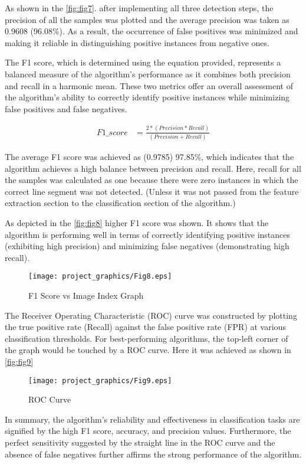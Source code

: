 \documentclass[]{iat}
\begin{document}
\par
As shown in the \autoref{fig:fig7}. after implementing all three detection steps, the precision of all the samples was plotted and the average precision was taken as 0.9608 (96.08\%). As a result, the occurrence of false positives was minimized and making it reliable in distinguishing positive instances from negative ones.
\par
The F1 score, which is determined using the equation provided, represents a balanced measure of the algorithm's performance as it combines both precision and recall in a harmonic mean. These two metrics offer an overall assessment of the algorithm's ability to correctly identify positive instances while minimizing false positives and false negatives.
\par
\FloatBarrier
\begin{align}
F1\_score &=\frac{2*(Precision*Recall)}{(Precision+Recall)}
\end{align}

The average F1 score was achieved as (0.9785) 97.85\%, which indicates that the algorithm achieves a high balance between precision and recall. Here, recall for all the samples was calculated as one because there were zero instances in which the correct line segment was not detected. (Unless it was not passed from the feature extraction section to the classification section of the algorithm.)
\par
As depicted in the \autoref{fig:fig8} higher F1 score was shown. It shows that the algorithm is performing well in terms of correctly identifying positive instances (exhibiting high precision) and minimizing false negatives (demonstrating high recall). 
\par
\FloatBarrier
\begin{figure}[h]
    
	\texttt{[image: project\_graphics/Fig8.eps]}
	\caption{F1 Score vs Image Index Graph}
	\label{fig:fig8}
\end{figure}
The Receiver Operating Characteristic (ROC) curve was constructed by plotting the true positive rate (Recall) against the false positive rate (FPR) at various classification thresholds. For best-performing algorithms, the top-left corner of the graph would be touched by a ROC curve.
Here it was achieved as shown in \autoref{fig:fig9}
\par
\FloatBarrier
\begin{figure}[h]
	\texttt{[image: project\_graphics/Fig9.eps]}
	\caption{ROC Curve}
	\label{fig:fig9}
\end{figure}
\par
In summary, the algorithm's reliability and effectiveness in classification tasks are signified by the high F1 score, accuracy, and precision values. Furthermore, the perfect sensitivity suggested by the straight line in the ROC curve and the absence of false negatives further affirms the strong performance of the algorithm.
\par
\end{document}
